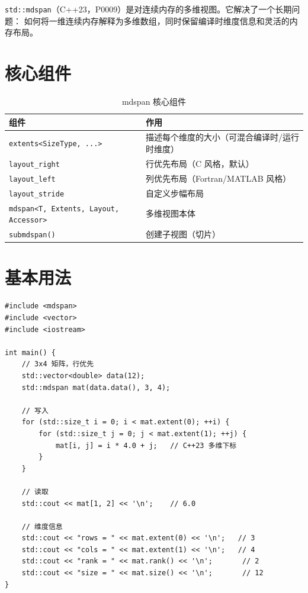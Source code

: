 \documentclass[12pt,a4paper,fontset=fandol]{ctexbook}
\newcommand{\cpp}[1]{C++#1}
\newcommand{\Tp}[1]{\texttt{#1}}
\begin{document}
\Tp{std::mdspan}（\cpp{23}，P0009）是对连续内存的多维视图。它解决了一个长期问题：
如何将一维连续内存解释为多维数组，同时保留编译时维度信息和灵活的内存布局。

\section{核心组件}

\begin{table}[htbp]
\centering
\caption{mdspan 核心组件}
\begin{tabularx}{\textwidth}{l X}
\toprule
\textbf{组件} & \textbf{作用} \\
\midrule
\Tp{extents<SizeType, ...>} & 描述每个维度的大小（可混合编译时/运行时维度） \\
\Tp{layout\_right}          & 行优先布局（C 风格，默认） \\
\Tp{layout\_left}           & 列优先布局（Fortran/MATLAB 风格） \\
\Tp{layout\_stride}         & 自定义步幅布局 \\
\Tp{mdspan<T, Extents, Layout, Accessor>} & 多维视图本体 \\
\Tp{submdspan()}            & 创建子视图（切片） \\
\bottomrule
\end{tabularx}
\end{table}

\section{基本用法}

\begin{lstlisting}
#include <mdspan>
#include <vector>
#include <iostream>

int main() {
    // 3x4 矩阵，行优先
    std::vector<double> data(12);
    std::mdspan mat(data.data(), 3, 4);

    // 写入
    for (std::size_t i = 0; i < mat.extent(0); ++i) {
        for (std::size_t j = 0; j < mat.extent(1); ++j) {
            mat[i, j] = i * 4.0 + j;   // C++23 多维下标
        }
    }

    // 读取
    std::cout << mat[1, 2] << '\n';    // 6.0

    // 维度信息
    std::cout << "rows = " << mat.extent(0) << '\n';   // 3
    std::cout << "cols = " << mat.extent(1) << '\n';   // 4
    std::cout << "rank = " << mat.rank() << '\n';       // 2
    std::cout << "size = " << mat.size() << '\n';       // 12
}
\end{lstlisting}
\end{document}
